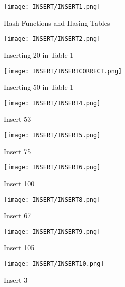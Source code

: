\documentclass[12pt]{article}
\begin{document}
\begin{figure}[htbp]
    \centering
    \texttt{[image: INSERT/INSERT1.png]}
    \caption{Hash Functions and Hasing Tables}
    \label{fig:insertion_step1}
\end{figure}


\begin{figure}[htbp]
    \centering
    \texttt{[image: INSERT/INSERT2.png]}
    \caption{Inserting 20 in Table 1}
    \label{fig:insertion_step2}
\end{figure}

\begin{figure}[htbp]
    \centering
    \texttt{[image: INSERT/INSERTCORRECT.png]}
    \caption{Inserting 50 in Table 1}
    \label{fig:insertion_step1}
\end{figure}

\begin{figure}[htbp]
    \centering
    \texttt{[image: INSERT/INSERT4.png]}
    \caption{Insert 53}
    \label{fig:insertion_step1}
\end{figure}

\begin{figure}[htbp]
    \centering
    \texttt{[image: INSERT/INSERT5.png]}
    \caption{Insert 75}
    \label{fig:insertion_step1}
\end{figure}

\begin{figure}[htbp]
    \centering
    \texttt{[image: INSERT/INSERT6.png]}
    \caption{Insert 100}
    \label{fig:insertion_step1}
\end{figure}



\begin{figure}[htbp]
    \centering
    \texttt{[image: INSERT/INSERT8.png]}
    \caption{Insert 67}
    \label{fig:insertion_step1}
\end{figure}


\begin{figure}[htbp]
    \centering
    \texttt{[image: INSERT/INSERT9.png]}
    \caption{Insert 105}
    \label{fig:insertion_step1}
\end{figure}


\begin{figure}[htbp]
    \centering
    \texttt{[image: INSERT/INSERT10.png]}
    \caption{Insert 3}
    \label{fig:insertion_step1}
\end{figure}
\end{document}
